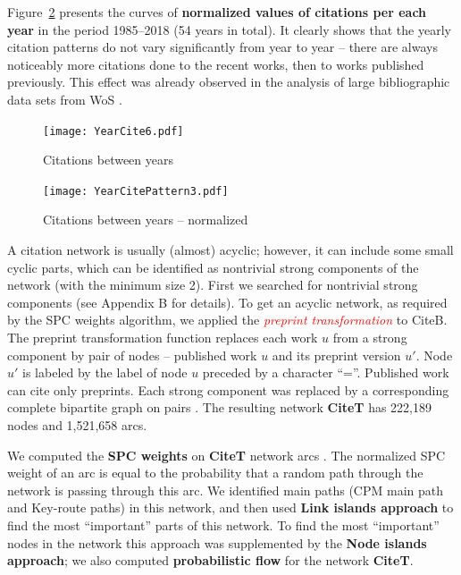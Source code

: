 \documentclass[11pt]{article} %
\newcommand{\keyw}[1]{\textcolor{red}{\emph{#1}}}
\begin{document}
Figure~\ref{yearcitenorm} presents the curves of \textbf{normalized values of citations per each year} in the period 1985--2018 (54 years in total). It clearly shows that the yearly citation patterns do not vary significantly from year to year -- there are always noticeably more citations done to the recent works, then to works published previously. This effect was already observed in the analysis of large bibliographic data sets from WoS \citep{lovro}. \medskip 


\begin{figure}
\begin{center}
\texttt{[image: YearCite6.pdf]}
\caption{Citations between years}\label{yearcite}
\end{center}
\end{figure} 

\begin{figure}
\begin{center}
\texttt{[image: YearCitePattern3.pdf]}
\caption{Citations between years -- normalized}\label{yearcitenorm}
\end{center}
\end{figure}

A citation network is usually (almost) acyclic; however, it can include some small cyclic parts, which can be identified as nontrivial strong components of the network (with the minimum size 2). First we searched for nontrivial strong components (see Appendix B for details). To get an acyclic network, as required by the SPC weights algorithm, we applied the \keyw{preprint transformation} to CiteB. The preprint transformation function replaces each work $u$ from a strong component by pair of nodes -- published work $u$ and its preprint version $u'$. Node $u'$ is  labeled by the label of node $u$ preceded by a character ``=''. Published work can cite only preprints. Each strong component was replaced by a corresponding complete bipartite graph on pairs \citep{Understand}. The resulting network \textbf{CiteT} has 222,189 nodes and 1,521,658 arcs.\medskip

We computed the \textbf{SPC weights} on \textbf{CiteT} network arcs \citep{Understand, arxiv}. The normalized SPC weight of an arc is equal to the probability that a random path through the network is passing through this arc. We identified main paths (CPM main path and Key-route paths) in this network, and then used \textbf{Link islands approach} \citep{Understand} to find the most ``important'' parts of this network. 
To find the most ``important'' nodes in the network this approach was supplemented by the \textbf{Node islands approach}; we also computed \textbf{probabilistic flow} for the network  \textbf{CiteT}. 
 
\end{document}
